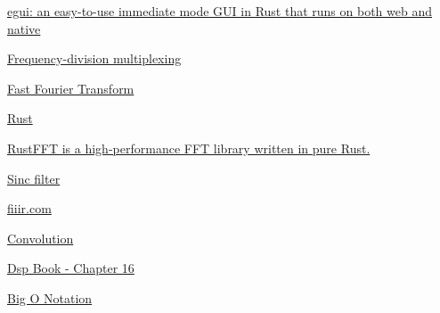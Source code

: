 \documentclass{article}
\begin{document}
\begin{thebibliography}{9}
    \href{https://github.com/emilk/egui}{egui: an easy-to-use immediate mode GUI in Rust that runs on both web and native}

    \href{https://en.wikipedia.org/wiki/Frequency-division_multiplexing}{Frequency-division multiplexing}

    \href{https://en.wikipedia.org/wiki/Fast_Fourier_transform}{Fast Fourier Transform}

    \href{https://rust-lang.org}{Rust}

    \href{https://docs.rs/rustfft/latest/rustfft/}{RustFFT is a high-performance FFT library written in pure Rust.}

    \href{https://en.wikipedia.org/wiki/Sinc_filter}{Sinc filter}

    \href{https://fiiir.com/}{fiiir.com}

    \href{https://en.wikipedia.org/wiki/Convolution}{Convolution}

    \href{https://www.analog.com/media/en/technical-documentation/dsp-book/dsp_book_Ch16.pdf}{Dsp Book - Chapter 16}

    \href{https://en.wikipedia.org/wiki/Big_O_notation}{Big O Notation}
\end{thebibliography}
\end{document}
